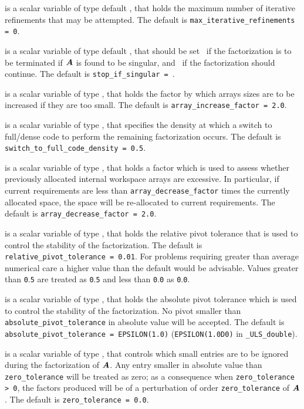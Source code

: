 \documentclass{galahad}
\newcommand{\packagename}{ULS}
\newcommand{\fullpackagename}{\libraryname\_\-\packagename}
\begin{document}
\begin{description}
 is a scalar variable of type default
\integer, that holds
the maximum number of iterative refinements that may be attempted.
The default is {\tt max\_iterative\_refinements = 0}.

 is a scalar variable of type default
\logical, that should be set \true\ if the factorization is
to be terminated if ${\bm{A}}$ is found to be singular, and
\false\ if the factorization should continue.
The default is {\tt stop\_if\_singular = \false}.

 is a scalar variable of type \realdp, that holds
the factor by which arrays sizes are to be increased if they are too small.
The default is {\tt array\_increase\_factor = 2.0}.

 is a scalar variable of type \realdp,
that specifies the density at which a switch to full/dense code
to perform the remaining factorization occurs.
The default is {\tt switch\_to\_full\_code\_density = 0.5}.

 is a scalar variable of type \realdp, that holds
a factor which is used to assess whether previously allocated internal
workspace arrays are excessive. In particular, if current requirements are
less than {\tt array\_decrease\_factor} times the currently allocated space,
the space will be re-allocated to current requirements.
The default is {\tt array\_decrease\_factor = 2.0}.

 is a scalar variable of type \realdp,
that holds the relative pivot tolerance that is used to control the
stability of the factorization.
The default is {\tt relative\_pivot\-\_tolerance = 0.01}.
For problems requiring greater
than average numerical care a higher value than the default would be
advisable. Values greater than {\tt 0}.{\tt 5} are treated as {\tt 0}.{\tt 5}
and less than {\tt 0}.{\tt 0} as {\tt 0}.{\tt 0}.

 is a scalar variable of type \realdp, that
holds the absolute pivot tolerance which is used to control the
stability of the factorization.
No pivot smaller than {\tt absolute\_pivot\_tolerance} in
absolute value will be accepted.
The default is {\tt absolute\_pivot\_\-tolerance = EPSILON(1.0)}
({\tt EPSILON(1.0D0)} in {\tt \fullpackagename\_double}).

 is a scalar variable of type \realdp, that
controls which small entries are to be ignored during the factorization
of ${\bm{A}}$. Any entry smaller in absolute value than
{\tt zero\_\-tolerance} will be treated as zero; as a consequence when
{\tt zero\_tolerance > 0}, the factors produced will be of a perturbation
of order {\tt zero\_tolerance} of ${\bm{A}}$.
The default is {\tt zero\_tolerance = 0.0}.


\end{description}
\end{document}
